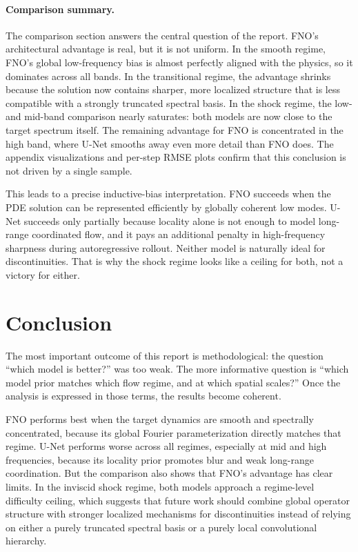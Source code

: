 \documentclass[11pt]{article}
\begin{document}
\paragraph{Comparison summary.}
The comparison section answers the central question of the report. FNO's architectural advantage is real, but it is not uniform. In the smooth regime, FNO's global low-frequency bias is almost perfectly aligned with the physics, so it dominates across all bands. In the transitional regime, the advantage shrinks because the solution now contains sharper, more localized structure that is less compatible with a strongly truncated spectral basis. In the shock regime, the low- and mid-band comparison nearly saturates: both models are now close to the target spectrum itself. The remaining advantage for FNO is concentrated in the high band, where U-Net smooths away even more detail than FNO does. The appendix visualizations and per-step RMSE plots confirm that this conclusion is not driven by a single sample.

This leads to a precise inductive-bias interpretation. FNO succeeds when the PDE solution can be represented efficiently by globally coherent low modes. U-Net succeeds only partially because locality alone is not enough to model long-range coordinated flow, and it pays an additional penalty in high-frequency sharpness during autoregressive rollout. Neither model is naturally ideal for discontinuities. That is why the shock regime looks like a ceiling for both, not a victory for either.

\section{Conclusion}
The most important outcome of this report is methodological: the question ``which model is better?'' was too weak. The more informative question is ``which model prior matches which flow regime, and at which spatial scales?'' Once the analysis is expressed in those terms, the results become coherent.

FNO performs best when the target dynamics are smooth and spectrally concentrated, because its global Fourier parameterization directly matches that regime. U-Net performs worse across all regimes, especially at mid and high frequencies, because its locality prior promotes blur and weak long-range coordination. But the comparison also shows that FNO's advantage has clear limits. In the inviscid shock regime, both models approach a regime-level difficulty ceiling, which suggests that future work should combine global operator structure with stronger localized mechanisms for discontinuities instead of relying on either a purely truncated spectral basis or a purely local convolutional hierarchy.
\end{document}
